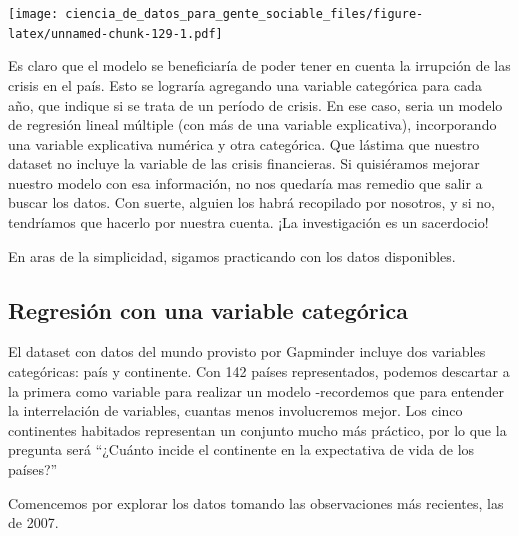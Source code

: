 \documentclass[spanish,]{book}
\newenvironment{Shaded}{\begin{snugshade}}{\end{snugshade}}
\newcommand{\DataTypeTok}[1]{\textcolor[rgb]{0.13,0.29,0.53}{#1}}
\newcommand{\DecValTok}[1]{\textcolor[rgb]{0.00,0.00,0.81}{#1}}
\newcommand{\KeywordTok}[1]{\textcolor[rgb]{0.13,0.29,0.53}{\textbf{#1}}}
\newcommand{\NormalTok}[1]{#1}
\newcommand{\OperatorTok}[1]{\textcolor[rgb]{0.81,0.36,0.00}{\textbf{#1}}}
\newcommand{\StringTok}[1]{\textcolor[rgb]{0.31,0.60,0.02}{#1}}
\begin{document}
\texttt{[image: ciencia\_de\_datos\_para\_gente\_sociable\_files/figure-latex/unnamed-chunk-129-1.pdf]}

Es claro que el modelo se beneficiaría de poder tener en cuenta la irrupción de las crisis en el país. Esto se lograría agregando una variable categórica para cada año, que indique si se trata de un período de crisis. En ese caso, seria un modelo de regresión lineal múltiple (con más de una variable explicativa), incorporando una variable explicativa numérica y otra categórica. Que lástima que nuestro dataset no incluye la variable de las crisis financieras. Si quisiéramos mejorar nuestro modelo con esa información, no nos quedaría mas remedio que salir a buscar los datos. Con suerte, alguien los habrá recopilado por nosotros, y si no, tendríamos que hacerlo por nuestra cuenta. ¡La investigación es un sacerdocio!

En aras de la simplicidad, sigamos practicando con los datos disponibles.

\hypertarget{regresiuxf3n-con-una-variable-categuxf3rica}{%
\subsection{Regresión con una variable categórica}\label{regresiuxf3n-con-una-variable-categuxf3rica}}

El dataset con datos del mundo provisto por Gapminder incluye dos variables categóricas: país y continente. Con 142 países representados, podemos descartar a la primera como variable para realizar un modelo -recordemos que para entender la interrelación de variables, cuantas menos involucremos mejor. Los cinco continentes habitados representan un conjunto mucho más práctico, por lo que la pregunta será ``¿Cuánto incide el continente en la expectativa de vida de los países?''

Comencemos por explorar los datos tomando las observaciones más recientes, las de 2007.

\begin{Shaded}
\end{Shaded}
\end{document}
